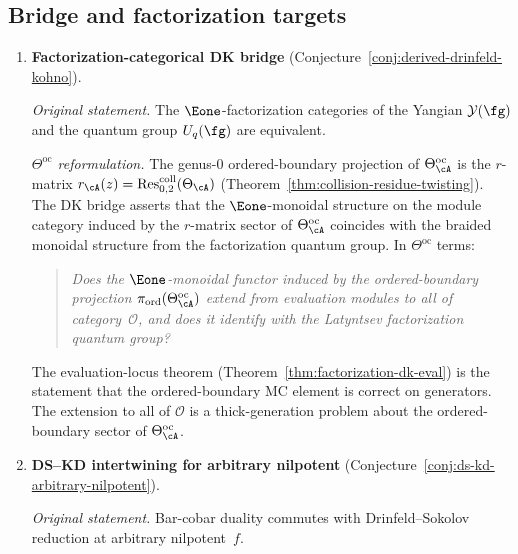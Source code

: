 \subsection{Bridge and factorization targets}

\begin{enumerate}[resume, label=\textup{(\arabic*)}]

\item \textbf{Factorization-categorical DK bridge}
 (Conjecture~\ref{conj:derived-drinfeld-kohno}).

 \smallskip\noindent
 \emph{Original statement.}
 The $\Eone$-factorization categories of the Yangian
 $\mathcal{Y}(\fg)$ and the quantum group $U_q(\fg)$ are
 equivalent.

 \smallskip\noindent
 \emph{$\Theta^{\mathrm{oc}}$ reformulation.}
 The genus-$0$ ordered-boundary projection of
 $\Theta^{\mathrm{oc}}_\cA$ is the $r$-matrix
 $r_\cA(z) = \operatorname{Res}^{\mathrm{coll}}_{0,2}(\Theta_\cA)$
 (Theorem~\ref{thm:collision-residue-twisting}).
 The DK bridge asserts that the $\Eone$-monoidal structure on
 the module category induced by the $r$-matrix sector of
 $\Theta^{\mathrm{oc}}_\cA$ coincides with the braided monoidal
 structure from the factorization quantum group.
 In $\Theta^{\mathrm{oc}}$ terms:
 \begin{quote}
 \emph{Does the $\Eone$-monoidal functor induced by the
 ordered-boundary projection
 $\pi_{\mathrm{ord}}(\Theta^{\mathrm{oc}}_\cA)$
 extend from evaluation modules to all of category~$\mathcal{O}$,
 and does it identify with the Latyntsev factorization
 quantum group?}
 \end{quote}
 The evaluation-locus theorem
 (Theorem~\ref{thm:factorization-dk-eval}) is the statement
 that the ordered-boundary MC element is correct on generators.
 The extension to all of $\mathcal{O}$ is a thick-generation
 problem about the ordered-boundary sector of
 $\Theta^{\mathrm{oc}}_\cA$.

\item \textbf{DS--KD intertwining for arbitrary nilpotent}
 (Conjecture~\ref{conj:ds-kd-arbitrary-nilpotent}).

 \smallskip\noindent
 \emph{Original statement.}
 Bar-cobar duality commutes with Drinfeld--Sokolov reduction
 at arbitrary nilpotent~$f$.


\end{enumerate}
